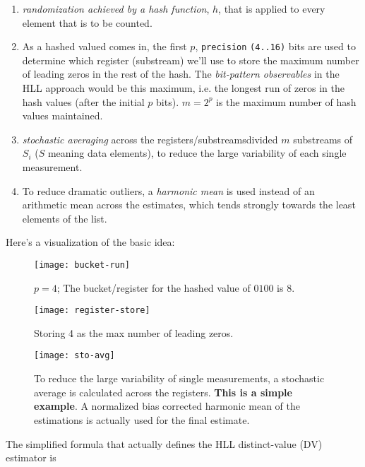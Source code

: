 \documentclass[12pt]{article}
\begin{document}
\begin{enumerate}
\item \textit{randomization achieved by a hash function}, $h$, that is applied
  to every element that is to be counted.
\item As a hashed valued comes in, the first $p$, \texttt{precision}
  \texttt{(4..16)} bits are used to determine which register (substream)
  we'll use to store the maximum number of leading zeros in the rest of the
  hash. The \textit{bit-pattern observables} in the HLL approach would be this
  maximum, i.e. the longest run of zeros in the hash values (after the initial
  $p$ bits). $m = 2^p$ is the maximum number of hash values maintained.
\item \textit{stochastic averaging} across the
  registers/substreams\textemdash divided $m$ substreams of $S_i$
  ($S$ meaning data elements), to reduce the large variability of each single
  measurement.
\item To reduce dramatic outliers, a \textit{harmonic mean} is used instead of
  an arithmetic mean across the estimates, which tends strongly towards the
  least elements of the list\cite{Harmonic-mean:Online}.
\end{enumerate}

Here's a visualization of the basic idea\cite{Kiip:Online}:

\begin{figure}[H]
\centering
\texttt{[image: bucket-run]}
\caption{$p=4$; The bucket/register for the hashed value of $0100$ is $8$.}
\label{figurebucketrun}
\end{figure}

\begin{figure}[H]
\centering
\texttt{[image: register-store]}
\caption{Storing 4 as the max number of leading zeros.}
\label{figurestoreregister}
\end{figure}

\begin{figure}[H]
\centering
\texttt{[image: sto-avg]}
\caption{To reduce the large variability of single measurements, a stochastic
  average is calculated across the registers. \textbf{This is a simple example}.
  A normalized bias corrected harmonic mean of the estimations is actually used
  for the final estimate.}
\label{figurestoaverage}
\end{figure}

The simplified formula that actually defines the HLL distinct-value (DV)
estimator\cite{Neustar:Online} is
\end{document}
